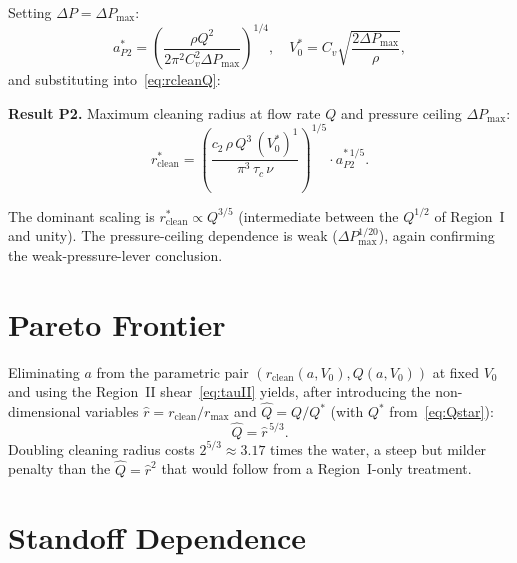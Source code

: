 \documentclass[aps,prfluids,reprint,amsmath,amssymb,floatfix]{revtex4-2}
\begin{document}
Setting $\Delta P = \Delta P_\mathrm{max}$:
\begin{equation}
  a^*_{P2} = \left(\frac{\rho Q^2}{2\pi^2 C_v^2 \Delta P_\mathrm{max}}\right)^{1/4},
  \quad V_0^* = C_v\sqrt{\frac{2\Delta P_\mathrm{max}}{\rho}},
  \label{eq:aP2}
\end{equation}
and substituting into~\eqref{eq:rcleanQ}:
\begin{mdframed}[style=resultbox]
\textbf{Result P2.} Maximum cleaning radius at flow rate $Q$ and
pressure ceiling $\Delta P_\mathrm{max}$:
\begin{equation}
  r^*_\mathrm{clean}
  = \left(\frac{c_2\,\rho\,Q^3\,(V_0^*)^{1}}{\pi^3\,\tau_c\,\nu}\right)^{1/5}
  \cdot a^{*\,1/5}_{P2}.
  \label{eq:rstar}
\end{equation}
\end{mdframed}
The dominant scaling is $r^*_\mathrm{clean} \propto Q^{3/5}$ (intermediate
between the $Q^{1/2}$ of Region~I and unity). The pressure-ceiling
dependence is weak ($\Delta P_\mathrm{max}^{1/20}$), again confirming
the weak-pressure-lever conclusion.

\section{Pareto Frontier}
\label{sec:pareto}

Eliminating $a$ from the parametric pair
$(r_\mathrm{clean}(a, V_0), Q(a, V_0))$ at fixed $V_0$ and using the
Region~II shear~\eqref{eq:tauII} yields, after introducing the
non-dimensional variables $\hat r = r_\mathrm{clean}/r_\mathrm{max}$ and
$\hat Q = Q/Q^*$ (with $Q^*$ from~\eqref{eq:Qstar}):
\begin{equation}
  \hat Q = \hat r^{\,5/3}.
  \label{eq:pareto}
\end{equation}
Doubling cleaning radius costs $2^{5/3} \approx 3.17$ times the water,
a steep but milder penalty than the $\hat Q = \hat r^2$ that would follow
from a Region~I-only treatment.

\section{Standoff Dependence}
\label{sec:standoff}
\end{document}

